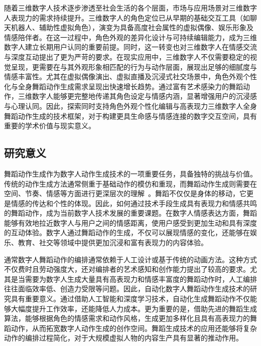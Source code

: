 随着三维数字人技术逐步渗透至社会生活的各个层面，市场与应用场景对三维数字人表现力的需求持续提升。三维数字人的角色定位已从早期的基础交互工具（如聊天机器人、辅助性虚拟角色），演变为具备高度社会属性的虚拟偶像、娱乐形象及情感陪伴者。在这一过程中，角色外观的差异化设计与可持续编辑能力，成为三维数字人建立长期用户认同的重要前提。同时，这一转变也对三维数字人在情感交流与深度互动提出了更为严苛的要求。在现实应用中，三维数字人不仅需要稳定的视觉呈现，更需要在与其外观形象相匹配的行为与动作层面，展现出足够的细腻度与情感丰富性。尤其在虚拟偶像演出、虚拟直播及沉浸式社交场景中，角色外观个性化与全身舞蹈动作生成需求呈现出快速增长趋势。通过富有艺术感染力的舞蹈动作，三维数字人能够更完整地传递其角色设定与情感内涵，显著增强用户的沉浸感与心理认同。因此，探索同时支持角色外观个性化编辑与高表现力三维数字人全身舞蹈动作生成的技术框架，对于构建更具生命感与情感连接的数字交互空间，具有重要的学术价值与现实意义。

\subsection{研究意义}
舞蹈动作生成作为数字人动作生成技术的一项重要任务，具备独特的挑战与价值。传统的动作生成方法通常侧重于基础动作的模仿和重现，而舞蹈动作生成则需要在空间、节奏、情感等方面进行更深层次的理解~\cite{fink2021evolution, kico2018digitization}。舞蹈不仅仅是身体的移动，它更是情感的传达和个性的体现。因此，如何通过技术手段生成具有表现力和情感共鸣的舞蹈动作，成为当前数字人技术发展的重要课题。在数字人情感表达方面，舞蹈能够有效地拉近数字人与用户之间的情感距离，使用户感受到更加生动和具有深度的互动体验。数字人通过舞蹈动作的生成，不仅可以展现情感的变化，还能够在娱乐、教育、社交等领域中提供更加沉浸和富有表现力的内容体验。

通常数字人舞蹈动作的编排通常依赖于人工设计或基于传统的动画方法。这种方式不仅费时且劳动强度大，还对编排者的艺术感知和创作能力提出了较高的要求。尤其是当需要为数字人生成大量具有高表现力和情感丰富度的舞蹈动作时，人工编排往往面临效率低、创造力受限等问题。因此，自动化数字人舞蹈动作生成技术的研究具有重要意义。通过借助人工智能和深度学习技术，自动化生成舞蹈动作不仅能够大幅度提升工作效率，还能降低人力成本。更为重要的是，借助先进的舞蹈生成算法，能够根据角色的情感需求和动作风格，生成更加多样化且具有高表现力的舞蹈动作，从而拓宽数字人动作生成的创作空间。舞蹈生成技术的应用还能够将复杂动作的编排过程简化，对于大规模虚拟人物的内容生产具有显著的推动作用。


